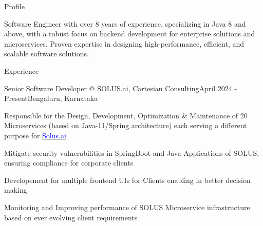 \documentclass[
	a4paper, %
	12pt, %
]{resume} %
\begin{document}
\begin{rSection}{Profile}
	\item Software Engineer with over 8 years of experience, specializing in Java 8 and above, with a robust focus on backend development for enterprise solutions and microservices. Proven expertise in designing high-performance, efficient, and scalable software solutions. 

\end{rSection}

\begin{rSection}{Experience}
	\hspace{-2em}
\end{rSection}

\begin{rSubsection}{Senior Software Developer @ SOLUS.ai, Cartesian Consulting}{April 2024 - Present}{}{Bengaluru, Karnataka}
		\setlength{\itemsep}{0.01em}
		\item{Responsible for the Design, Development, Optimization \& Maintenance of 20 Microservices (based on Java-11/Spring architecture) each serving a different purpose for \href{https://docs.solus.ai/docs/category/apis}{\textcolor{blue}{Solus.ai}}}
		\item Mitigate security vulnerabilities in SpringBoot and Java Applications of SOLUS, ensuring compliance for corporate clients		
		\item Developement for multiple frontend UIs for Clients enabling in better decision making
		\item Monitoring and Improving performance of SOLUS Microservice infrastructure based on ever evolving client requirements
	\end{rSubsection}
\end{document}
